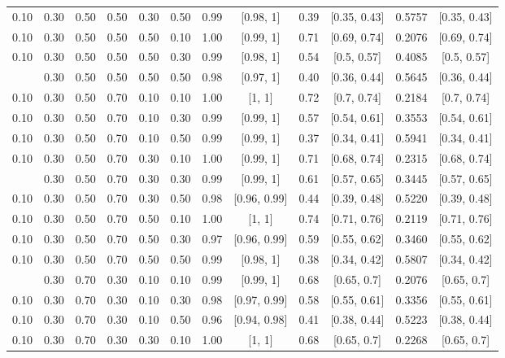 \documentclass[
  11pt,
]{article}
\begin{document}
\begin{landscape}
\begin{ThreePartTable}
\begin{longtable}[t]{cccccccccccc}
0.10 & 0.30 & 0.50 & 0.50 & 0.30 & 0.50 & 0.99 & {}[0.98, 1] & 0.39 & {}[0.35, 0.43] & 0.5757 & {}[0.35, 0.43]\\
0.10 & 0.30 & 0.50 & 0.50 & 0.50 & 0.10 & 1.00 & {}[0.99, 1] & 0.71 & {}[0.69, 0.74] & 0.2076 & {}[0.69, 0.74]\\
0.10 & 0.30 & 0.50 & 0.50 & 0.50 & 0.30 & 0.99 & {}[0.98, 1] & 0.54 & {}[0.5, 0.57] & 0.4085 & {}[0.5, 0.57]\\
\addlinespace
0.10 & 0.30 & 0.50 & 0.50 & 0.50 & 0.50 & 0.98 & {}[0.97, 1] & 0.40 & {}[0.36, 0.44] & 0.5645 & {}[0.36, 0.44]\\
0.10 & 0.30 & 0.50 & 0.70 & 0.10 & 0.10 & 1.00 & {}[1, 1] & 0.72 & {}[0.7, 0.74] & 0.2184 & {}[0.7, 0.74]\\
0.10 & 0.30 & 0.50 & 0.70 & 0.10 & 0.30 & 0.99 & {}[0.99, 1] & 0.57 & {}[0.54, 0.61] & 0.3553 & {}[0.54, 0.61]\\
0.10 & 0.30 & 0.50 & 0.70 & 0.10 & 0.50 & 0.99 & {}[0.99, 1] & 0.37 & {}[0.34, 0.41] & 0.5941 & {}[0.34, 0.41]\\
0.10 & 0.30 & 0.50 & 0.70 & 0.30 & 0.10 & 1.00 & {}[0.99, 1] & 0.71 & {}[0.68, 0.74] & 0.2315 & {}[0.68, 0.74]\\
\addlinespace
0.10 & 0.30 & 0.50 & 0.70 & 0.30 & 0.30 & 0.99 & {}[0.99, 1] & 0.61 & {}[0.57, 0.65] & 0.3445 & {}[0.57, 0.65]\\
0.10 & 0.30 & 0.50 & 0.70 & 0.30 & 0.50 & 0.98 & {}[0.96, 0.99] & 0.44 & {}[0.39, 0.48] & 0.5220 & {}[0.39, 0.48]\\
0.10 & 0.30 & 0.50 & 0.70 & 0.50 & 0.10 & 1.00 & {}[1, 1] & 0.74 & {}[0.71, 0.76] & 0.2119 & {}[0.71, 0.76]\\
0.10 & 0.30 & 0.50 & 0.70 & 0.50 & 0.30 & 0.97 & {}[0.96, 0.99] & 0.59 & {}[0.55, 0.62] & 0.3460 & {}[0.55, 0.62]\\
0.10 & 0.30 & 0.50 & 0.70 & 0.50 & 0.50 & 0.99 & {}[0.98, 1] & 0.38 & {}[0.34, 0.42] & 0.5807 & {}[0.34, 0.42]\\
\addlinespace
0.10 & 0.30 & 0.70 & 0.30 & 0.10 & 0.10 & 0.99 & {}[0.99, 1] & 0.68 & {}[0.65, 0.7] & 0.2076 & {}[0.65, 0.7]\\
0.10 & 0.30 & 0.70 & 0.30 & 0.10 & 0.30 & 0.98 & {}[0.97, 0.99] & 0.58 & {}[0.55, 0.61] & 0.3356 & {}[0.55, 0.61]\\
0.10 & 0.30 & 0.70 & 0.30 & 0.10 & 0.50 & 0.96 & {}[0.94, 0.98] & 0.41 & {}[0.38, 0.44] & 0.5223 & {}[0.38, 0.44]\\
0.10 & 0.30 & 0.70 & 0.30 & 0.30 & 0.10 & 1.00 & {}[1, 1] & 0.68 & {}[0.65, 0.7] & 0.2268 & {}[0.65, 0.7]\\

\end{longtable}
\end{ThreePartTable}
\end{landscape}
\end{document}
